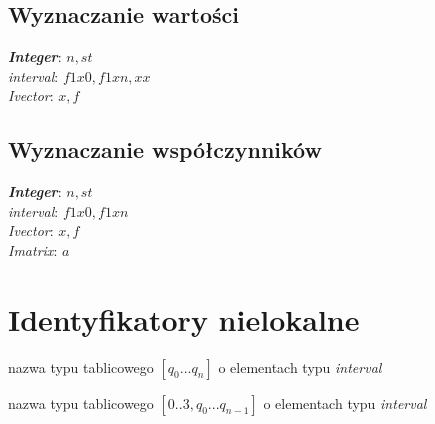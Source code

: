 \documentclass[a4paper, 10pt]{article}
\begin{document}
\subsection*{Wyznaczanie wartości}

\textbf{\textit{Integer}}: $n,st$\\
\textit{interval}: $f1x0,f1xn,xx$\\
\textit{Ivector}: $x,f$

\subsection*{Wyznaczanie współczynników}

\textbf{\textit{Integer}}: $n,st$\\
\textit{interval}: $f1x0,f1xn$\\
\textit{Ivector}: $x,f$\\
\textit{Imatrix}: $a$

\section{Identyfikatory nielokalne}

\begin{description}[before={\renewcommand\makelabel[1]{\normalfont ##1}}]
\item[\textit{Ivector} --] nazwa typu tablicowego $[q_0...q_n]$ o elementach typu \textit{interval}
\item[\textit{Imatrix} --] nazwa typu tablicowego $[0..3, q_0...q_{n-1}]$ o elementach typu \textit{interval}
\end{description}
\end{document}
